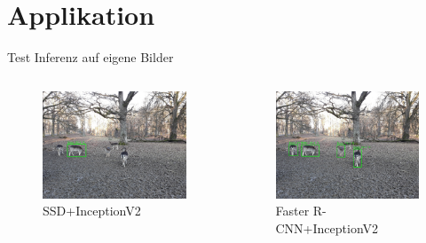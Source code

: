 \section[\thesection \  Applikation]{Applikation}\label{sec:application}

\begin{frame}{Test Inferenz auf eigene Bilder} 
        
    \begin{columns}
        \begin{figure}
            \centering
            \includegraphics[width=\textwidth]{Bilder/infer_result_ssd.jpg}
            \caption{SSD+InceptionV2}
        \end{figure}
        
        \begin{figure}
            \centering
            \includegraphics[width=\textwidth]{Bilder/infer_result_faster.jpg}
            \caption{Faster R-CNN+InceptionV2}
        \end{figure}
    \end{columns}

\end{frame}

